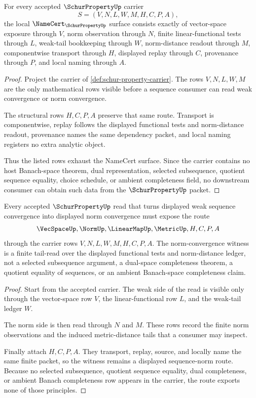 \begin{theorem}
\label{thm:schur-property-namecert-obligations}
For every accepted $\SchurPropertyUp$ carrier
$$
S=(V,N,L,W,M,H,C,P,A),
$$
the local $\NameCert_{\SchurPropertyUp}$ surface consists exactly of vector-space exposure through $V$, norm observation through $N$, finite linear-functional tests through $L$, weak-tail bookkeeping through $W$, norm-distance readout through $M$, componentwise transport through $H$, displayed replay through $C$, provenance through $P$, and local naming through $A$.
\end{theorem}
\begin{proof}
Project the carrier of \autoref{def:schur-property-carrier}. The rows $V,N,L,W,M$ are the only mathematical rows visible before a sequence consumer can read weak convergence or norm convergence.

The structural rows $H,C,P,A$ preserve that same route. Transport is componentwise, replay follows the displayed functional tests and norm-distance readout, provenance names the same dependency packet, and local naming registers no extra analytic object.

Thus the listed rows exhaust the NameCert surface. Since the carrier contains no host Banach-space theorem, dual representation, selected subsequence, quotient sequence equality, choice schedule, or ambient completeness field, no downstream consumer can obtain such data from the $\SchurPropertyUp$ packet.
\end{proof}

\begin{theorem}
\label{thm:schur-property-sequence-norm-witness}
Every accepted $\SchurPropertyUp$ read that turns displayed weak sequence convergence into displayed norm convergence must expose the route
$$
\VecSpaceUp,\NormUp,\LinearMapUp,\MetricUp,H,C,P,A
$$
through the carrier rows $V,N,L,W,M,H,C,P,A$. The norm-convergence witness is a finite tail-read over the displayed functional tests and norm-distance ledger, not a selected subsequence argument, a dual-space completeness theorem, a quotient equality of sequences, or an ambient Banach-space completeness claim.
\end{theorem}
\begin{proof}
Start from the accepted carrier. The weak side of the read is visible only through the vector-space row $V$, the linear-functional row $L$, and the weak-tail ledger $W$.

The norm side is then read through $N$ and $M$. These rows record the finite norm observations and the induced metric-distance tails that a consumer may inspect.

Finally attach $H,C,P,A$. They transport, replay, source, and locally name the same finite packet, so the witness remains a displayed sequence-norm route. Because no selected subsequence, quotient sequence equality, dual completeness, or ambient Banach completeness row appears in the carrier, the route exports none of those principles.
\end{proof}

